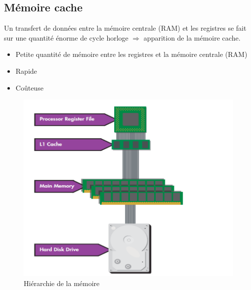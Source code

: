 \documentclass[a4paper]{article}
\begin{document}
    \subsection{Mémoire cache}
    Un transfert de données entre la mémoire centrale (RAM) et les registres se fait sur une quantité énorme de cycle horloge $\Rightarrow$ apparition de la mémoire cache.
    \begin{itemize}
      \item Petite quantité de mémoire entre les registres et la mémoire centrale (RAM)
      \item Rapide
      \item Coûteuse
    \end{itemize}
    \begin{figure}[H]
      \centering
      \includegraphics[width = 0.5 \textwidth]{images/9.PNG}
      \caption{Hiérarchie de la mémoire}
    \end{figure}
    
\end{document}
